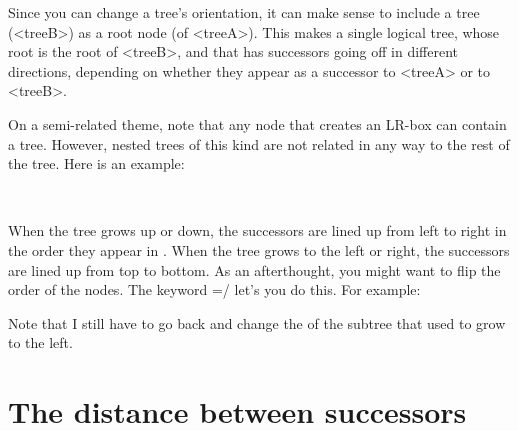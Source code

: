 \documentclass[11pt,english,BCOR10mm,DIV12,bibliography=totoc,parskip=false,smallheadings
    headexclude,footexclude,oneside]{pst-doc}
\begin{document}
Since you can change a tree's orientation, it can make sense to include a tree
(<treeB>) as a root node (of <treeA>). This makes a single logical tree, whose
root is the root of <treeB>, and that has successors going off in different
directions, depending on whether they appear as a successor to <treeA> or to
<treeB>.

\begin{LTXexample}[pos=l,width=0.4\linewidth]
\end{LTXexample}





On a semi-related theme, note that any node that creates an LR-box can contain
a tree. However, nested trees of this kind are not related in any way to the
rest of the tree. Here is an example:

\begin{LTXexample}[pos=l,width=0.4\linewidth]
  \\
    \TC
    \TC
  \endpsTree
\end{LTXexample}

When the tree grows up or down, the successors are lined up from left to right
in the order they appear in . When the tree grows to the left or
right, the successors are lined up from top to bottom. As an afterthought, you
might want to flip the order of the nodes. The keyword =\true/\false
let's you do this. For example:

\begin{LTXexample}[pos=l,width=0.4\linewidth]
\footnotesize
{}
\end{LTXexample}
Note that I still have to go back and change the  of the subtree
that used to grow to the left.


\section{The distance between successors}
\end{document}
